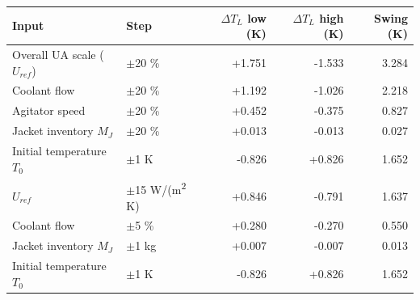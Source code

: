 \begin{tabular}{llrrr}
\toprule
Input & Step & $\Delta T_L$ low (K) & $\Delta T_L$ high (K) & Swing (K) \\
\midrule
Overall UA scale ($U_{ref}$) & $\pm$20 \% & +1.751 & -1.533 & 3.284 \\
Coolant flow & $\pm$20 \% & +1.192 & -1.026 & 2.218 \\
Agitator speed & $\pm$20 \% & +0.452 & -0.375 & 0.827 \\
Jacket inventory $M_J$ & $\pm$20 \% & +0.013 & -0.013 & 0.027 \\
Initial temperature $T_0$ & $\pm$1 K & -0.826 & +0.826 & 1.652 \\
$U_{ref}$ & $\pm$15 W/(m\textsuperscript{2} K) & +0.846 & -0.791 & 1.637 \\
Coolant flow & $\pm$5 \% & +0.280 & -0.270 & 0.550 \\
Jacket inventory $M_J$ & $\pm$1 kg & +0.007 & -0.007 & 0.013 \\
Initial temperature $T_0$ & $\pm$1 K & -0.826 & +0.826 & 1.652 \\
\bottomrule
\end{tabular}
